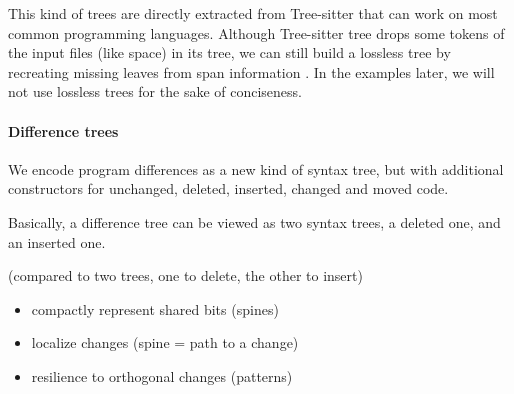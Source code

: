 \documentclass[a4paper,11pt]{article}
\newcommand\del[1]{\text{\st{$#1$}}}
\newcommand\ins[1]{\text{\ul{$#1$}}}
\begin{document}

This kind of trees are directly extracted from Tree-sitter  that can work on
most common programming languages. Although Tree-sitter tree drops some tokens
of the input files (like space) in its tree, we can still build a lossless tree
by recreating missing leaves from span information .
In the examples later, we will not use lossless trees for the sake of
conciseness.

\paragraph{Difference trees}
We encode program differences as a new kind of syntax tree, but with additional
constructors for unchanged, deleted, inserted, changed and moved code.

\newcommand{\aSpineSum}{\ensuremath{\aSum\!\aSum}}
\newcommand{\aSpineProd}{\ensuremath{\aProd\!\aProd}}
\newcommand{\aDiffTree}{\ensuremath{\aTree\!\aTree}}
\newcommand{\aPatternTree}{\ensuremath{\mathsf{pat}}}
\newcommand{\aVar}{\ensuremath{\alpha}}
\newcommand{\defCopy}{\ensuremath{\square}}
\newcommand{\defIdent}[2]{\defNode{#1}{#2}}
\newcommand{\defReplace}[2]{\del{#1} \mapsto \ins{#2}}

Basically, a difference tree can be viewed as two syntax trees, a deleted one, and
an
inserted one. 


 (compared to two trees, one to delete, the other to insert)
\begin{itemize}
\item compactly represent shared bits (spines)
\item localize changes (spine = path to a change)
\item resilience to orthogonal changes (patterns)
\end{itemize}



\end{document}
